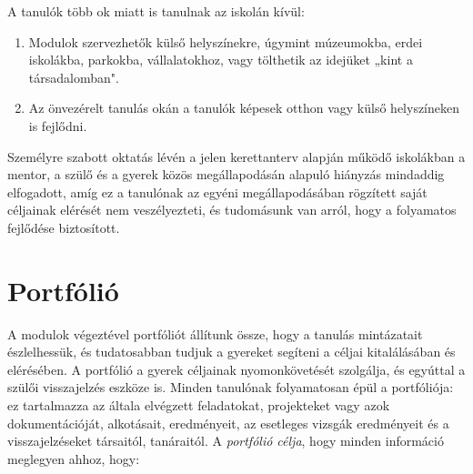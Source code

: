 A tanulók több ok miatt is tanulnak az iskolán kívül:
\begin{enumerate}
\item Modulok szervezhetők külső helyszínekre, úgymint múzeumokba, erdei iskolákba, parkokba, vállalatokhoz, vagy tölthetik az idejüket „kint a társadalomban".

\item Az önvezérelt tanulás okán a tanulók képesek otthon vagy külső helyszíneken is fejlődni.
\end{enumerate}
Személyre szabott oktatás lévén a jelen kerettanterv alapján működő iskolákban a mentor, a szülő és a gyerek közös megállapodásán alapuló hiányzás mindaddig elfogadott, amíg ez a tanulónak az  egyéni megállapodásában rögzített saját céljainak elérését nem veszélyezteti, és tudomásunk van arról, hogy a folyamatos fejlődése biztosított.

\section{Portfólió}


A modulok végeztével portfóliót állítunk össze, hogy a tanulás mintázatait észlelhessük, és tudatosabban tudjuk a gyereket segíteni a céljai kitalálásában és elérésében. A portfólió a gyerek céljainak nyomonkövetését szolgálja, és egyúttal a szülői visszajelzés eszköze is. Minden tanulónak folyamatosan épül a portfóliója: ez tartalmazza az általa elvégzett feladatokat, projekteket vagy azok dokumentációját, alkotásait, eredményeit, az esetleges vizsgák eredményeit és a visszajelzéseket társaitól, tanáraitól. A \emph{portfólió célja}, hogy minden információ meglegyen ahhoz, hogy:

